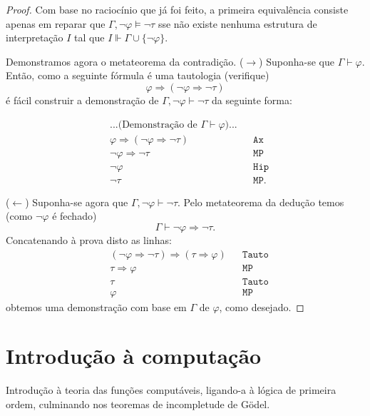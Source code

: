\documentclass{report}
\theoremstyle{definition}
\theoremstyle{remark}
\newcommand{\imply}{\mathbin{\Rightarrow}}
\begin{document}
	\begin{proof}
	Com base no raciocínio que já foi feito, a primeira equivalência consiste apenas em reparar que $\Gamma, \neg \varphi \vDash \neg \tau$ sse não existe nenhuma estrutura de interpretação $I$ tal que $I \Vdash \Gamma \cup \{\neg \varphi\}$.
	
	Demonstramos agora o metateorema da contradição. ($\rightarrow$) Suponha-se que $\Gamma \vdash \varphi$. Então, como a seguinte fórmula é uma tautologia (verifique)
	\[\varphi \imply (\neg \varphi \imply \neg \tau)\]
	é fácil construir a demonstração de $\Gamma, \neg \varphi \vdash \neg \tau$ da seguinte forma:
	
	\begin{align*}
	&\text{...(Demonstração de $\Gamma \vdash \varphi$)...}\\
	&\varphi \imply (\neg \varphi \imply \neg \tau)&&\texttt{Ax}\\
	&\neg \varphi \imply \neg \tau&&\texttt{MP}\\
	&\neg \varphi&&\texttt{Hip}\\
	&\neg \tau&&\texttt{MP}.
	\end{align*}
	
	($\leftarrow$) Suponha-se agora que $\Gamma, \neg \varphi \vdash \neg \tau$. Pelo metateorema da dedução temos (como $\neg \varphi$ é fechado)
	\[\Gamma \vdash \neg \varphi \imply \neg \tau.\]
	Concatenando à prova disto as linhas:
	\begin{align*}
	&(\neg \varphi \imply \neg \tau) \imply (\tau \imply \varphi)&&\texttt{Tauto}\\
	&\tau \imply \varphi&&\texttt{MP}\\
	&\tau&&\texttt{Tauto}\\
	&\varphi&&\texttt{MP}
	\end{align*}
	obtemos uma demonstração com base em $\Gamma$ de $\varphi$, como desejado.
	\end{proof}
	
	
	\chapter{Introdução à computação}
	
	Introdução à teoria das funções computáveis, ligando-a à lógica de primeira ordem, culminando nos teoremas de incompletude de Gödel.
	
	
	\nocite{fltc}
	\nocite{shoenfield}
	
	
	
\end{document}
